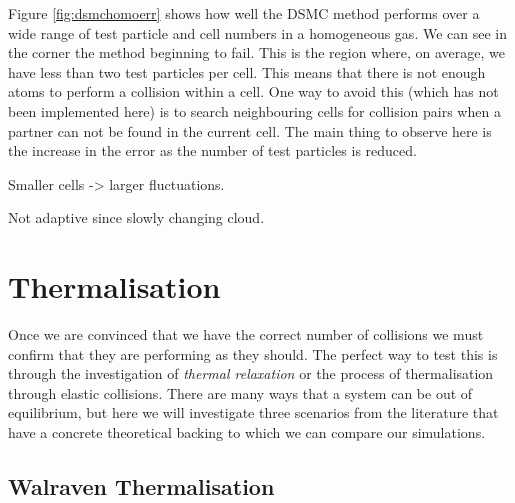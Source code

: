 Figure \ref{fig:dsmchomoerr} shows how well the DSMC method performs over a wide range of test particle and cell numbers in a homogeneous gas. 
We can see in the corner the method beginning to fail. 
This is the region where, on average, we have less than two test particles per cell. 
This means that there is not enough atoms to perform a collision within a cell. 
One way to avoid this (which has not been implemented here) is to search neighbouring cells for collision pairs when a partner can not be found in the current cell.
The main thing to observe here is the increase in the error as the number of test particles is reduced.

Smaller cells -> larger fluctuations.

Not adaptive since slowly changing cloud.



\section{Thermalisation} 

Once we are convinced that we have the correct number of collisions we must confirm that they are performing as they should.
The perfect way to test this is through the investigation of \emph{thermal relaxation} or the process of thermalisation through elastic collisions.
There are many ways that a system can be out of equilibrium, but here we will investigate three scenarios from the literature that have a concrete theoretical backing to which we can compare our simulations.

\subsection{Walraven Thermalisation} \label{sec:walravenTherm}

